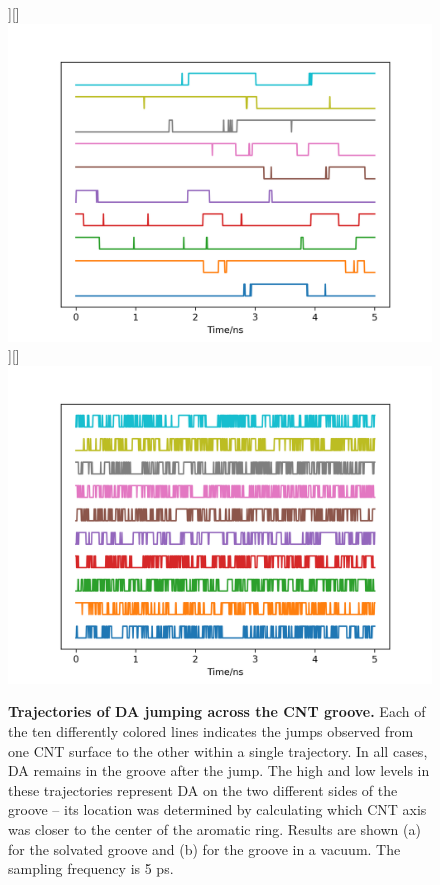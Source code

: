 \documentclass[journal=jpcbfk, layout=twocolumn, manuscript=article]{achemso}
\begin{document}
\begin{figure}[!htbp]
    \centering
    \subfloat[]][]{\includegraphics[width=.4\textwidth]{Figures/groove/jump/solvated_ring.png}}
    \subfloat[]][]{\includegraphics[width=.4\textwidth]{Figures/groove/jump/vacuum_ring.png}}
    \caption{\textbf{Trajectories of DA jumping across the CNT groove.} Each of the ten differently colored lines indicates the jumps observed from one CNT surface to the other within a single trajectory. In all cases, DA remains in the groove after the jump. The high and low levels in these trajectories represent DA on the two different sides of the groove -- its location was determined by calculating which CNT axis was closer to the center of the aromatic ring. Results are shown (a) for the solvated groove and (b) for the groove in a vacuum. The sampling frequency is 5 ps.
    }
    \label{fig:groove-jumps}
\end{figure}


% 
\end{document}
